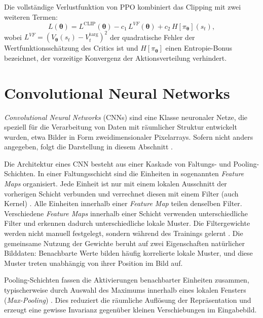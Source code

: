 Die vollständige Verlustfunktion von PPO kombiniert das Clipping mit zwei weiteren Termen:
\begin{equation} \label{eq:ppo_full}
    L(\boldsymbol{\theta}) =
    L^{\mathrm{CLIP}}(\boldsymbol{\theta})
    - c_1\, L^{VF}(\boldsymbol{\theta})
    + c_2\, H\!\left[\pi_{\boldsymbol{\theta}}\right]\!(s_t),
\end{equation}
wobei $L^{VF} = (V_{\boldsymbol{\theta}}(s_t) - V_t^{\mathrm{targ}})^2$ der quadratische
Fehler der Wertfunktionsschätzung des Critics ist und
$H[\pi_{\boldsymbol{\theta}}]$ einen Entropie-Bonus bezeichnet, der vorzeitige
Konvergenz der Aktionsverteilung verhindert.

\section{Convolutional Neural Networks}
\label{sec:cnn}

\textit{Convolutional Neural Networks} (CNNs) sind eine Klasse neuronaler Netze, die speziell für die Verarbeitung von Daten mit räumlicher Struktur entwickelt wurden, etwa Bilder in Form zweidimensionaler Pixelarrays. Sofern nicht anders angegeben, folgt die Darstellung in diesem Abschnitt \textcite{lecunDeepLearning2015}.

Die Architektur eines CNN besteht aus einer Kaskade von Faltungs- und Pooling-Schichten. In einer Faltungsschicht sind die Einheiten in sogenannten \textit{Feature Maps} organisiert. Jede Einheit ist nur mit einem lokalen Ausschnitt der vorherigen Schicht verbunden und verrechnet diesen mit einem Filter (auch Kernel) \autocite{botschParametrischeMethoden2023}. Alle Einheiten innerhalb einer \textit{Feature Map} teilen denselben Filter. Verschiedene \textit{Feature Maps} innerhalb einer Schicht verwenden unterschiedliche Filter und erkennen dadurch unterschiedliche lokale Muster. Die Filtergewichte werden nicht manuell festgelegt, sondern während des Trainings gelernt \autocite{botschParametrischeMethoden2023}. Die gemeinsame Nutzung der Gewichte beruht auf zwei Eigenschaften natürlicher Bilddaten: Benachbarte Werte bilden häufig korrelierte lokale Muster, und diese Muster treten unabhängig von ihrer Position im Bild auf.

Pooling-Schichten fassen die Aktivierungen benachbarter Einheiten zusammen, typischerweise durch Auswahl des Maximums innerhalb eines lokalen Fensters (\textit{Max-Pooling}) \autocite{botschParametrischeMethoden2023}. Dies reduziert die räumliche Auflösung der Repräsentation und erzeugt eine gewisse Invarianz gegenüber kleinen Verschiebungen im Eingabebild.


